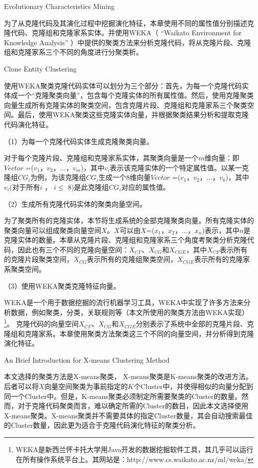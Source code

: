 {Evolutionary Characteristics Mining}

为了从克隆代码及其演化过程中挖掘演化特征，本章使用不同的属性值分别描述克隆代码、克隆组和克隆家系实体。并使用WEKA（ “Waikato Environment for Knowledge Analysis” \cite{hall2009weka}）中提供的聚类方法来分析克隆代码，将从克隆片段、克隆组和克隆家系三个不同的角度进行分聚类析。

{Clone Entity Clustering}

使用WEKA聚类克隆代码实体可以划分为三个部分：首先，为每一个克隆代码实体成一个“克隆聚类向量”，包含每个克隆实体的所有属性值。然后，使用克隆聚类向量生成所有克隆实体的聚类空间，包含克隆片段、克隆组和克隆家系三个聚类空间。最后，使用WEKA聚类这些克隆实体向量，并根据聚类结果分析和提取克隆代码演化特征。

（1）为每一个克隆代码实体生成克隆聚类向量。 

对于每个克隆片段、克隆组和克隆家系实体，其聚类向量是一个$m$维向量：即{$Vector$ ={($v_1$，$v_2$，$...$，$v_m$)}}，其中$v_i$表示该克隆实体的一个特定属性值。以某一克隆组{$CG_i$}为例，为该克隆组{$CG_i$}生成一个8维向量{$Vector$ =($v_1$，$v_2$，$...$，$v_8$)}，其中$v_i$(对于所有$i$ ， $i \leq $ 8)是此克隆组{$CG_i$}对应的属性值。
 
（2）生成所有克隆代码实体的聚类向量空间。

为了聚类所有的克隆实体，本节将生成系统的全部克隆聚类向量。所有克隆实体的聚类向量可以组成聚类向量空间$X$。$X$可以由{$X$={($x_1$，$x_2$，$...$，$x_n$)}}表示，其中$n$是克隆实体的数量。本章从克隆片段、克隆组和克隆家系三个角度考聚类分析克隆代码，因此也有三个不同的克隆向量空间：$X_{CF}$、$X_{CG}$和$X_{CGE}$，其中$X_{CF}$表示所有的克隆片段聚类空间，$X_{CG}$表示所有的克隆组聚类空间，$X_{CGE}$表示所有的克隆家系聚类空间。
  
（3）使用WEKA聚类克隆特征向量。

WEKA是一个用于数据挖掘的流行机器学习工具，WEKA中实现了许多方法来分析数据，例如聚类，分类，关联规则等（本文所使用的聚类方法由WEKA实现）\footnote{WEKA是新西兰怀卡托大学用Java开发的数据挖掘软件工具，其几乎可以运行在所有操作系统平台上。其网站是：http://www.cs.waikato.ac.nz/ml/weka/}。 克隆代码的向量空间$X_{CF}$、$X_{CG}$和$X_{CGE}$分别表示了系统中全部的克隆片段、克隆组和克隆家系。本章使用聚类方法聚类这三个不同的向量空间，并分析得到克隆演化特征。

{An Brief Introduction for X-means Clustering Method}

本文选择的聚类方法是X-means聚类\cite{pelleg2000x}， X-means聚类是K-means聚类\cite{arthur2007k}的改进方法。后者可以将$X$向量空间聚类为事前指定的$K$个Cluster中，并使得相似的向量分配到同一个Cluster中。但是，K-means聚类必须制定所需要聚类的Cluster的数量。然而，对于克隆代码聚类而言，难以确定所需的Cluster的数目，因此本文选择使用X-means聚类。X-means聚类并不需要具体的指定Cluster数量，其会自动搜索最佳的Cluster数量，因此更为适合于克隆代码演化特征的聚类分析。

